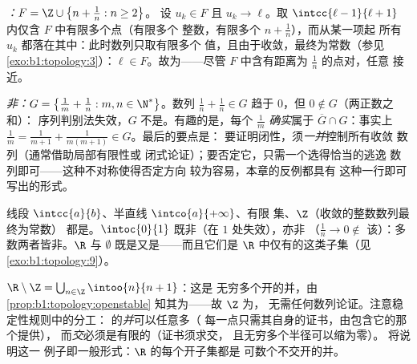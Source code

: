 \begin{example}[序列判别法的两个方向]\label{ex:b1:topology:seqtest}
\emph{：}$F = \Z \cup \bigl\{n + \frac1n : n \geq 2\bigr\}$。
设 $u_k \in F$ 且 $u_k \to \ell$。取 $\intcc{\ell -
1}{\ell + 1}$ 内仅含 $F$ 中有限多个点（有限多个
整数，有限多个 $n + \frac1n$），而从某一项起
所有 $u_k$ 都落在其中：此时数列只取有限多个
值，且由于收敛，最终为常数（参见
\cref{exo:b1:topology:3}）：$\ell \in F$。故为——尽管
$F$ 中含有距离为 $\frac1n$ 的点对，任意
接近。

\emph{非：}$G = \bigl\{\frac1m + \frac1n : m, n \in
\N^*\bigr\}$。数列 $\frac1n + \frac1n \in G$ 趋于
$0$，但 $0 \notin G$（两正数之和）：
序列判别法失效，$G$ 不是。有趣的是，每个
$\frac1m$ \emph{确实}属于 $\overline G \cap G$：事实上
$\frac1m = \frac{1}{m+1} + \frac{1}{m(m+1)} \in G$。最后的要点是：
要证明闭性，须\emph{一并}控制所有收敛
数列（通常借助局部有限性或
闭式论证）；要否定它，只需一个选得恰当的逃逸
数列即可——这种不对称使得否定方向
较为容易，本章的反例都具有
这种一行即可写出的形式。
\end{example}

\begin{example}\label{ex:b1:topology:closed}
线段 $\intcc{a}{b}$、半直线 $\intco{a}{+\infty}$、有限
集、$\Z$（收敛的整数数列最终为常数）
都是。$\intoc{0}{1}$ 既非（在 $1$ 处失效），亦非
（$\frac 1n \to 0 \notin$ 该）：多数两者皆非。$\R$ 与
$\emptyset$ 既是又是——而且它们是
$\R$ 中仅有的这类子集（见\cref{exo:b1:topology:9}）。
\end{example}

\begin{example}[由无穷多块拼成的开集]\label{ex:b1:topology:rminusz}
$\R \setminus \Z = \bigcup_{n \in \Z} \intoo{n}{n+1}$：这是
无穷多个开的并，由
\cref{prop:b1:topology:openstable} 知其为——故 $\Z$ 为，
无需任何数列论证。注意稳定性规则中的分工：
的\emph{并}可以任意多（
每一点只需其自身的证书，由包含它的那个提供），
而\emph{交}必须是有限的（证书须求交，
且无穷多个半径可以缩为零）。
 将说明这一
例子即一般形式：$\R$ 的每个开子集都是
可数个不交开的并。
\end{example}

